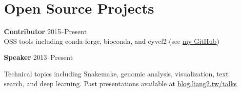 \section{Open Source Projects}

\begin{entrylist}

\item \normalsize \textbf{Contributor}\hfill
    2015--Present\\

    \small
    OSS tools including conda-forge, bioconda, and cyvcf2
    (see \href{https://github.com/ccwang002}{my GitHub})

\item \normalsize \textbf{Speaker}\hfill
    2013--Present

    \small
    Technical topics including Snakemake, genomic analysis, visualization, text search, and deep learning.
    Past presentations available at \href{https://blog.liang2.tw/talks/}{blog.liang2.tw/talks}

\end{entrylist}
